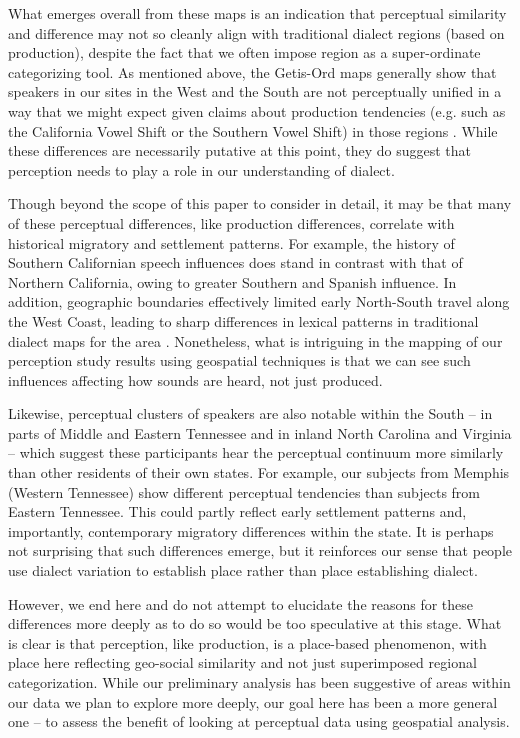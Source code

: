 \documentclass[output=paper]{LSP/langsci}
\begin{document}
What emerges overall from these maps is an indication that perceptual similarity and difference may not so cleanly align with traditional dialect regions (based on production), despite the fact that we often impose region as a super-ordinate categorizing tool. As mentioned above, the Getis-Ord maps generally show that speakers in our sites in the West and the South are not perceptually unified in a way that we might expect given claims about production tendencies (e.g. such as the California Vowel Shift or the Southern Vowel Shift) in those regions \citep{labov_atlas_2006-1}. While these differences are necessarily putative at this point, they do suggest that perception needs to play a role in our understanding of dialect.   

Though beyond the scope of this paper to consider in detail, it may be that many of these perceptual differences, like production differences, correlate with historical migratory and settlement patterns. For example, the history of Southern Californian speech influences does stand in contrast with that of Northern California, owing to greater Southern and Spanish influence. In addition, geographic boundaries effectively limited early North-South travel along the West Coast, leading to sharp differences in lexical patterns in traditional dialect maps for the area \citep{bright_word_1967,reed_problems_1972}. Nonetheless, what is intriguing in the mapping of our perception study results using geospatial techniques is that we can see such influences affecting how sounds are heard, not just produced. 

Likewise, perceptual clusters of speakers are also notable within the South – in parts of Middle and Eastern Tennessee and in inland North Carolina and Virginia – which suggest these participants hear the perceptual continuum more similarly than other residents of their own states. For example, our subjects from Memphis (Western Tennessee) show different perceptual tendencies than subjects from Eastern Tennessee. This could partly reflect early settlement patterns and, importantly, contemporary migratory differences within the state. It is perhaps not surprising that such differences emerge, but it reinforces our sense that people use dialect variation to establish place rather than place establishing dialect.

However, we end here and do not attempt to elucidate the reasons for these differences more deeply as to do so would be too speculative at this stage. What is clear is that perception, like production, is a place-based phenomenon, with place here reflecting geo-social similarity and not just superimposed regional categorization. While our preliminary analysis has been suggestive of areas within our data we plan to explore more deeply, our goal here has been a more general one – to assess the benefit of looking at perceptual data using geospatial analysis.
\end{document}
